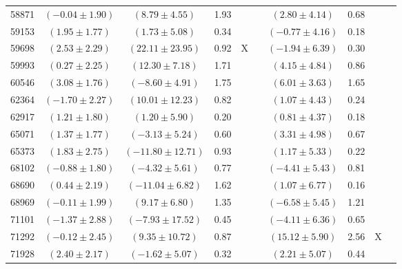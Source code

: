 \documentclass [10pt, twoside] {uwthesis}[2012/04/02]
\begin{document}
{\begin{longtable}[t]{|c|c|cccc|cccc|}
58871	&  $(	-0.04	  \pm  	1.90	)$  &  $(	8.79	  \pm  	4.55	)$  &  	1.93	  &  		  &  		  &  $(	2.80	  \pm  	4.14	)$  &  	0.68	  &  		  &  		  \\
59153	&  $(	1.95	  \pm  	1.77	)$  &  $(	1.73	  \pm  	5.08	)$  &  	0.34	  &  		  &  		  &  $(	-0.77	  \pm  	4.16	)$  &  	0.18	  &  		  &  		  \\
59698	&  $(	2.53	  \pm  	2.29	)$  &  $(	22.11	  \pm  	23.95	)$  &  	0.92	  &  	X	  &  		  &  $(	-1.94	  \pm  	6.39	)$  &  	0.30	  &  		  &  		  \\
59993	&  $(	0.27	  \pm  	2.25	)$  &  $(	12.30	  \pm  	7.18	)$  &  	1.71	  &  		  &  		  &  $(	4.15	  \pm  	4.84	)$  &  	0.86	  &  		  &  		  \\
60546	&  $(	3.08	  \pm  	1.76	)$  &  $(	-8.60	  \pm  	4.91	)$  &  	1.75	  &  		  &  		  &  $(	6.01	  \pm  	3.63	)$  &  	1.65	  &  		  &  		  \\
62364	&  $(	-1.70	  \pm  	2.27	)$  &  $(	10.01	  \pm  	12.23	)$  &  	0.82	  &  		  &  		  &  $(	1.07	  \pm  	4.43	)$  &  	0.24	  &  		  &  		  \\
62917	&  $(	1.21	  \pm  	1.80	)$  &  $(	1.20	  \pm  	5.90	)$  &  	0.20	  &  		  &  		  &  $(	0.81	  \pm  	4.37	)$  &  	0.18	  &  		  &  		  \\
65071	&  $(	1.37	  \pm  	1.77	)$  &  $(	-3.13	  \pm  	5.24	)$  &  	0.60	  &  		  &  		  &  $(	3.31	  \pm  	4.98	)$  &  	0.67	  &  		  &  		  \\
65373	&  $(	1.83	  \pm  	2.75	)$  &  $(	-11.80	  \pm  	12.71	)$  &  	0.93	  &  		  &  		  &  $(	1.17	  \pm  	5.33	)$  &  	0.22	  &  		  &  		  \\
68102	&  $(	-0.88	  \pm  	1.80	)$  &  $(	-4.32	  \pm  	5.61	)$  &  	0.77	  &  		  &  		  &  $(	-4.41	  \pm  	5.43	)$  &  	0.81	  &  		  &  		  \\
68690	&  $(	0.44	  \pm  	2.19	)$  &  $(	-11.04	  \pm  	6.82	)$  &  	1.62	  &  		  &  		  &  $(	1.07	  \pm  	6.77	)$  &  	0.16	  &  		  &  		  \\
68969	&  $(	-0.11	  \pm  	1.99	)$  &  $(	9.17	  \pm  	6.80	)$  &  	1.35	  &  		  &  		  &  $(	-6.58	  \pm  	5.45	)$  &  	1.21	  &  		  &  		  \\
71101	&  $(	-1.37	  \pm  	2.88	)$  &  $(	-7.93	  \pm  	17.52	)$  &  	0.45	  &  		  &  		  &  $(	-4.11	  \pm  	6.36	)$  &  	0.65	  &  		  &  		  \\
71292	&  $(	-0.12	  \pm  	2.45	)$  &  $(	9.35	  \pm  	10.72	)$  &  	0.87	  &  		  &  		  &  $(	15.12	  \pm  	5.90	)$  &  	2.56	  &  	X	  &  		  \\
71928	&  $(	2.40	  \pm  	2.17	)$  &  $(	-1.62	  \pm  	5.07	)$  &  	0.32	  &  		  &  		  &  $(	2.21	  \pm  	5.07	)$  &  	0.44	  &  		  &  		  \\

\end{longtable}}
\end{document}
